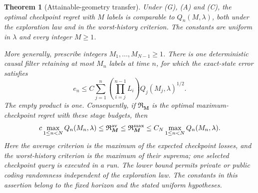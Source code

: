 \documentclass[11pt]{amsart}
\newtheorem{theorem}{Theorem}[section]
\theoremstyle{definition}\newtheorem{definition}[theorem]{Definition}
\theoremstyle{remark}\newtheorem{remark}[theorem]{Remark}
\begin{document}
\begin{theorem}[Attainable-geometry transfer]
\label{thm:causal-transfer}
Under \textup{(G)}, \textup{(A)} and \textup{(C)}, the optimal
checkpoint regret with $M$ labels is comparable to $Q_n(M,\lambda)$,
both under the exploration law and in the worst-history criterion.
The constants are uniform in $\lambda$ and every integer $M\ge1$.

More generally, prescribe integers $M_1,\ldots,M_{N-1}\ge1$.
There is one deterministic causal filter retaining at most $M_n$ labels
at time $n$, for which the exact-state error satisfies
\begin{equation}\label{eq:transfer-recurrence}
 e_n\le C\sum_{j=1}^n
    \left(\prod_{i=j}^{n-1}L_i\right)
                     Q_j(M_j,\lambda)^{1/2}.
\end{equation}
The empty product is one. Consequently, if $\mathfrak R_{\boldsymbol M}$
is the optimal maximum-checkpoint regret with these stage budgets, then
\begin{equation}\label{eq:transfer-causal-law}
 c\max_{1\le n<N}Q_n(M_n,\lambda)
 \le\mathfrak R_{\boldsymbol M}^{\rm av}
 \le\mathfrak R_{\boldsymbol M}^{\rm max}
 \le C_N\max_{1\le n<N}Q_n(M_n,\lambda).
\end{equation}
Here the average criterion is the maximum of the expected checkpoint
losses, and the worst-history criterion is the maximum of their suprema;
one selected checkpoint query is executed in a run.
The lower bound permits private or public coding randomness independent
of the exploration law. The constants in this assertion belong to the
fixed horizon and the stated uniform hypotheses.
\end{theorem}
\end{document}
